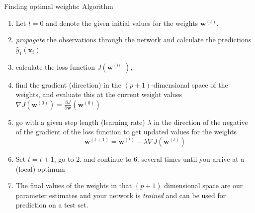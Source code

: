 \documentclass[10pt,ignorenonframetext,]{beamer}
\providecommand{\tightlist}{%
  \setlength{\itemsep}{0pt}\setlength{\parskip}{0pt}}
\begin{document}
\begin{frame}

\begin{block}{Finding optimal weights: Algorithm}

\begin{enumerate}
\tightlist
\item
  Let \(t=0\) and denote the given initial values for the weights
  \({\boldsymbol w}^{(t)}\),
\item
  \emph{propagate} the observations through the network and calculate
  the predictions \({\hat{y}_1({\boldsymbol x}_i)}\)
\item
  calculate the loss function \(J({\boldsymbol w}^{(0)})\),
\item
  find the gradient (direction) in the \((p+1)\)-dimensional space of
  the weights, and evaluate this at the current weight values
  \(\nabla J({\boldsymbol w}^{(0)})={\frac{\partial J}{\partial {\boldsymbol w}}}({\boldsymbol w}^{(0)})\)
\item
  go with a given step length (learning rate) \(\lambda\) in the
  direction of the negative of the gradient of the loss function to get
  updated values for the weights
  \[{\boldsymbol w}^{(t+1)}={\boldsymbol w}^{(t)} - \lambda \nabla J({\boldsymbol w}^{(t)})\]
\item
  Set \(t=t+1\), go to 2. and continue to 6. several times until you
  arrive at a (local) optimum
\item
  The final values of the weights in that \((p+1)\) dimensional space
  are our parameter estimates and your network is \emph{trained} and can
  be used for prediction on a test set.
\end{enumerate}

\end{block}

\end{frame}
\end{document}
